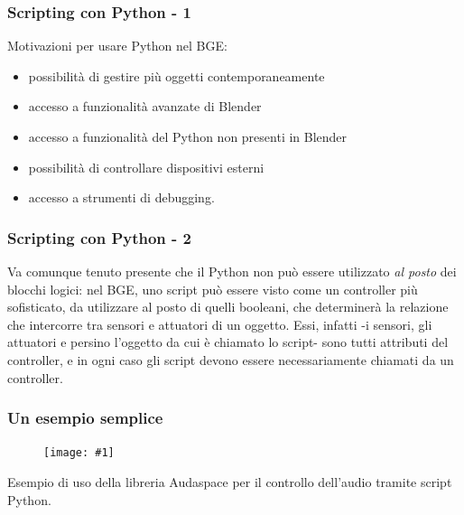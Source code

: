 \documentclass{beamer}
\def\image[#1][#2]{
	\begin{figure}[H]
		\centering
		\texttt{[image: \#1]}
\end{figure}}
\begin{document}
		\begin{frame}
		\frametitle{Scripting con Python - 1}
		Motivazioni per usare Python nel BGE:
			\begin{itemize}
				\item possibilità di gestire più oggetti contemporaneamente
				\item accesso a funzionalità avanzate di Blender
				\item accesso a funzionalità del Python non presenti in Blender
				\item possibilità di controllare dispositivi esterni
				\item accesso a strumenti di debugging.
			\end{itemize}
		\end{frame}	
		\begin{frame}
		\frametitle{Scripting con Python - 2}
		Va comunque tenuto presente che \textcolor{BlenderOrange}{il Python non può essere utilizzato \textit{al posto} dei blocchi logici}: nel BGE, uno script può essere visto come un controller più sofisticato, da utilizzare al posto di quelli booleani, che determinerà la relazione che intercorre tra sensori e attuatori di un oggetto. Essi, infatti -i sensori, 	gli attuatori e persino l'oggetto da cui è chiamato lo script- sono tutti attributi del controller, e in ogni caso gli script devono essere necessariamente chiamati da un controller.
		\end{frame}	
		\begin{frame}
			\frametitle{Un esempio semplice}
			\image[images/pysample.png][scale=0.23]
			Esempio di uso della libreria Audaspace per il controllo dell'audio tramite script Python.
		\end{frame}
	
\end{document}
